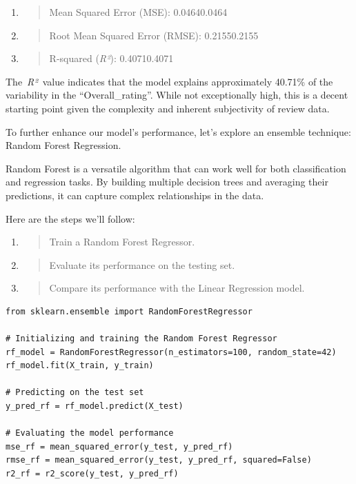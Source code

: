 \documentclass[
]{article}
\begin{document}
\begin{enumerate}
\def\labelenumi{\arabic{enumi}.}
\item
  \begin{quote}
  Mean Squared Error (MSE): 0.04640.0464
  \end{quote}
\item
  \begin{quote}
  Root Mean Squared Error (RMSE): 0.21550.2155
  \end{quote}
\item
  \begin{quote}
  R-squared (\emph{R²}): 0.40710.4071
  \end{quote}
\end{enumerate}

The~\emph{R²}~value indicates that the model explains approximately
40.71\% of the variability in the ``Overall\_rating''. While not
exceptionally high, this is a decent starting point given the complexity
and inherent subjectivity of review data.

To further enhance our model's performance, let's explore an ensemble
technique: Random Forest Regression.

Random Forest is a versatile algorithm that can work well for both
classification and regression tasks. By building multiple decision trees
and averaging their predictions, it can capture complex relationships in
the data.

Here are the steps we'll follow:

\begin{enumerate}
\def\labelenumi{\arabic{enumi}.}
\item
  \begin{quote}
  Train a Random Forest Regressor.
  \end{quote}
\item
  \begin{quote}
  Evaluate its performance on the testing set.
  \end{quote}
\item
  \begin{quote}
  Compare its performance with the Linear Regression model.
  \end{quote}
\end{enumerate}

\begin{verbatim}
from sklearn.ensemble import RandomForestRegressor

# Initializing and training the Random Forest Regressor
rf_model = RandomForestRegressor(n_estimators=100, random_state=42)
rf_model.fit(X_train, y_train)

# Predicting on the test set
y_pred_rf = rf_model.predict(X_test)

# Evaluating the model performance
mse_rf = mean_squared_error(y_test, y_pred_rf)
rmse_rf = mean_squared_error(y_test, y_pred_rf, squared=False)
r2_rf = r2_score(y_test, y_pred_rf)
\end{verbatim}
\end{document}
